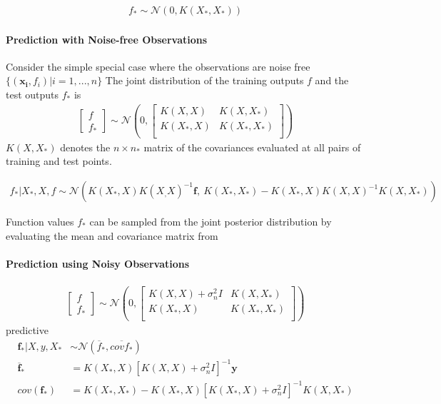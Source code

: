 \documentclass[a4paper]{article}
\begin{document}
\begin{align}
  f_* \sim \mathcal{N} (0, K(X_*, X_*))
\end{align}

\paragraph{Prediction with Noise-free Observations}
Consider the simple special case where the observations are noise free $\{(\mathbf{x_i},f_i)| i=1,...,n\}$
The joint distribution of the training outputs $f$ and the test outputs $f_*$ is
\begin{align}
  \begin{bmatrix}
    f\\
    f_*
  \end{bmatrix}
  \sim \mathcal{N}(0,
  \begin{bmatrix}
    K(X,X) & K(X,X_*)\\
    K(X_*,X) & K(X_*,X_*)\\
  \end{bmatrix})
\end{align}
$K(X, X_*)$ denotes the $n \times n_*$ matrix of the covariances evaluated at all pairs of training and test points.

\begin{align}
\label{eq:joint_posterior}
  f_*|X_*,X,f \sim \mathcal{N} (K(X_*,X) K(X_,X)^{-1} \mathbf{f},\: K(X_*,X_*) - K(X_*,X) K(X,X)^{-1} K(X,X_*) )
\end{align}

Function values $f_*$ can be sampled from the joint posterior distribution by evaluating the mean and covariance matrix from \cite{eq:joint_posterior} 

\paragraph{Prediction using Noisy Observations}

\begin{align}
  \begin{bmatrix}
    f\\
    f_*
  \end{bmatrix}
  \sim \mathcal{N}(0,
  \begin{bmatrix}
    K(X,X) + \sigma_n^2 I & K(X,X_*)\\
    K(X_*,X) & K(X_*,X_*)\\
  \end{bmatrix})
\end{align}
predictive
\begin{align*}
  \mathbf{f}_*|X,y,X_* &\sim \mathcal{N}(\overline{f}_*,\overline{cov{f_*}})\\
  \overline{\mathbf{f}}_* &= K(X_*,X)[K(X,X)+\sigma_n^2I]^{-1} \mathbf{y}\\
  cov(\mathbf{f}_*) &= K(X_*,X_*) - K(X_*,X)[K(X_*,X)+\sigma_n^2I]^{-1} K(X,X_*)
\end{align*}
\end{document}
